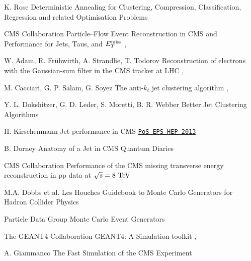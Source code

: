 {K. Rose}
{Deterministic Annealing for Clustering, Compression, Classification, Regression and related Optimisation Problems}
{}

{CMS Collaboration}
{Particle–Flow Event Reconstruction in CMS and Performance for Jets, Taus, and $E_T^\text{miss}$}
{, }

{W. Adam, R. Frühwirth, A. Strandlie, T. Todorov}
{Reconstruction of electrons with the Gaussian-sum filter in the CMS tracker at LHC}
{, }

{M. Cacciari, G. P. Salam, G. Soyez}
{The anti-$k_t$ jet clustering algorithm}
{, }

{Y. L. Dokshitzer, G. D. Leder, S. Moretti, B. R. Webber}
{Better Jet Clustering Algorithms}
{ }

{H. Kirschenmann}
{Jet performance in CMS}
{\texttt{\href{http://pos.sissa.it/archive/conferences/180/433/EPS-HEP\%202013_433.pdf}{PoS EPS-HEP 2013}}}

{B. Dorney}
{Anatomy of a Jet in CMS}
{Quantum Diaries}

{CMS Collaboration}
{Performance of the CMS missing transverse energy reconstruction in pp data at $\sqrt{s} = 8~\text{TeV}$}
{ }

{M.A. Dobbs et al.}
{Les Houches Guidebook to Monte Carlo Generators for Hadron Collider Physics}
{}

{Particle Data Group}
{Monte Carlo Event Generators}
{}

{The GEANT4 Collaboration}
{GEANT4: A Simulation toolkit}
{, }

{A. Giammanco}
{The Fast Simulation of the CMS Experiment}
{}


